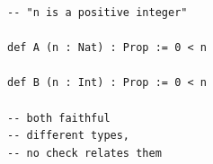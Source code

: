 \documentclass[border=8pt,12pt]{standalone}
\begin{document}
\begin{lstlisting}
-- "n is a positive integer"

def A (n : Nat) : Prop := 0 < n

def B (n : Int) : Prop := 0 < n

-- both faithful
-- different types,
-- no check relates them
\end{lstlisting}
\end{document}
